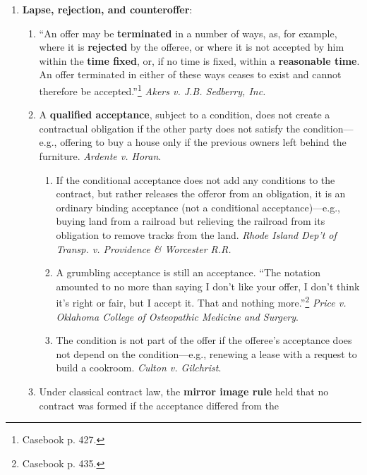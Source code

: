 \begin{enumerate}
\begin{enumerate}
    \end{enumerate}
    \item \textbf{Lapse, rejection, and counteroffer}:
    \begin{enumerate}
        \item ``An offer may be \textbf{terminated} in a number of ways, as, 
        for example, where it is \textbf{rejected} by the offeree, or where it 
        is not accepted by him within the \textbf{time fixed}, or, if no time 
        is fixed, within a \textbf{reasonable time}.  An offer terminated in 
        either of these ways ceases to exist and cannot therefore be 
        accepted.''\footnote{Casebook p. 427.} \emph{Akers v. J.B. Sedberry, 
        Inc.}
        \item A \textbf{qualified acceptance}, subject to a condition, does 
        not create a contractual obligation if the other party does not 
        satisfy the condition---e.g., offering to buy a house only if the 
        previous owners left behind the furniture. \emph{Ardente v. Horan}.
        \begin{enumerate}
            \item If the conditional acceptance does not add any conditions to 
            the contract, but rather releases the offeror from an obligation, 
            it is an ordinary binding acceptance (not a conditional 
            acceptance)---e.g., buying land from a railroad but relieving the 
            railroad from its obligation to remove tracks from the land. 
            \emph{Rhode Island Dep't of Transp. v.  Providence \& Worcester 
            R.R.}
            \item A grumbling acceptance is still an acceptance. ``The 
            notation amounted to no more than saying I don't like your offer, 
            I don't think it's right or fair, but I accept it. That and 
            nothing more.''\footnote{Casebook p. 435.} \emph{Price v. Oklahoma 
            College of Osteopathic Medicine and Surgery}.
            \item The condition is not part of the offer if the offeree's 
            acceptance does not depend on the condition---e.g., renewing a 
            lease with a request to build a cookroom. \emph{Culton v. 
            Gilchrist}.
        \end{enumerate}
        \item Under classical contract law, the \textbf{mirror image rule} 
        held that no contract was formed if the acceptance differed from the 

\end{enumerate}
\end{enumerate}
